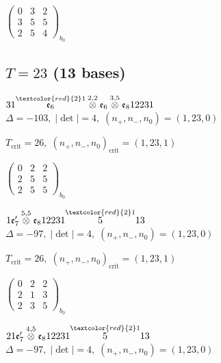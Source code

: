 \documentclass[10pt]{article}
\begin{document}
\hspace{2em}$\left(\begin{smallmatrix}0 & 3 & 2 \\ 3 & 5 & 5 \\ 2 & 5 & 4\end{smallmatrix}\right)_{\!b_0}$


\subsection*{$T = 23$ \quad (13 bases)}
\smallskip

$31\overset{\textcolor{red}{2}1}{\mathfrak{e}_6}\overset{2,2}{\otimes}\mathfrak{e}_6\overset{3,5}{\otimes}\mathfrak{e}_812231$ \quad $\Delta=-103,\; |\det|=4,\; (n_+,n_-,n_0)=(1,23,0)$

\hspace{1em}$T_{\text{crit}}=26,\; (n_+,n_-,n_0)_{\text{crit}}=(1,23,1)$

\hspace{2em}$\left(\begin{smallmatrix}0 & 2 & 2 \\ 2 & 5 & 5 \\ 2 & 5 & 5\end{smallmatrix}\right)_{\!b_0}$

\smallskip

$1\mathfrak{e}_7'\overset{5,5}{\otimes}\mathfrak{e}_812231\overset{\textcolor{red}{2}1}{5}13$ \quad $\Delta=-97,\; |\det|=4,\; (n_+,n_-,n_0)=(1,23,0)$

\hspace{1em}$T_{\text{crit}}=26,\; (n_+,n_-,n_0)_{\text{crit}}=(1,23,1)$

\hspace{2em}$\left(\begin{smallmatrix}0 & 2 & 2 \\ 2 & 1 & 3 \\ 2 & 3 & 5\end{smallmatrix}\right)_{\!b_0}$

\smallskip

$21\mathfrak{e}_7'\overset{4,5}{\otimes}\mathfrak{e}_812231\overset{\textcolor{red}{2}1}{5}13$ \quad $\Delta=-97,\; |\det|=4,\; (n_+,n_-,n_0)=(1,23,0)$
\end{document}
